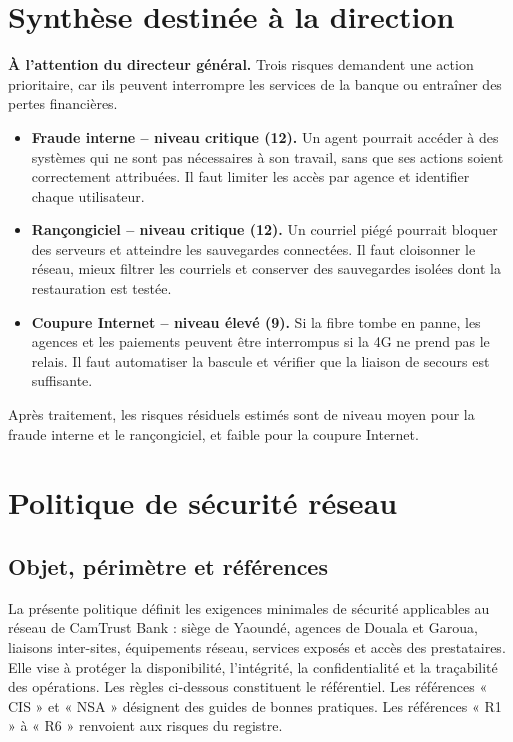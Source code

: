 \documentclass[11pt,a4paper]{article}
\begin{document}
	\section{Synthèse destinée à la direction}
	
	\textbf{À l'attention du directeur général.} Trois risques demandent une action prioritaire, car ils peuvent interrompre les services de la banque ou entraîner des pertes financières.
	
	\begin{itemize}
		\item \textbf{Fraude interne -- niveau critique (12).} Un agent pourrait accéder à des systèmes qui ne sont pas nécessaires à son travail, sans que ses actions soient correctement attribuées. Il faut limiter les accès par agence et identifier chaque utilisateur. 
		\item \textbf{Rançongiciel -- niveau critique (12).} Un courriel piégé pourrait bloquer des serveurs et atteindre les sauvegardes connectées. Il faut cloisonner le réseau, mieux filtrer les courriels et conserver des sauvegardes isolées dont la restauration est testée.
		\item \textbf{Coupure Internet -- niveau élevé (9).} Si la fibre tombe en panne, les agences et les paiements peuvent être interrompus si la 4G ne prend pas le relais. Il faut automatiser la bascule et vérifier que la liaison de secours est suffisante.
	\end{itemize}
	
	Après traitement, les risques résiduels estimés sont de niveau moyen pour la fraude interne et le rançongiciel, et faible pour la coupure Internet.
	
	\section{Politique de sécurité réseau}
	
	\subsection{Objet, périmètre et références}
	
	La présente politique définit les exigences minimales de sécurité applicables au réseau de CamTrust Bank : siège de Yaoundé, agences de Douala et Garoua, liaisons inter-sites, équipements réseau, services exposés et accès des prestataires. Elle vise à protéger la disponibilité, l'intégrité, la confidentialité et la traçabilité des opérations. Les règles ci-dessous constituent le référentiel. Les références « CIS » et « NSA » désignent des guides de bonnes pratiques. Les références « R1 » à « R6 » renvoient aux risques du registre.
	
\end{document}
